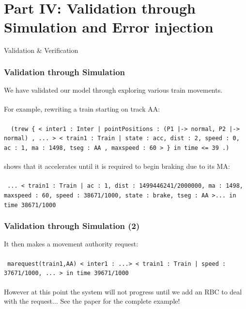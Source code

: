 \documentclass{beamer}
\begin{document}
\section{Part IV: Validation through Simulation and Error injection}

\begin{frame}
\begin{center}
{\Large Validation \& Verification}
\end{center}
\end{frame}


\begin{frame}
\frametitle{Validation through Simulation}
We have validated our model through exploring various train movements.\\ \quad \\

For example, rewriting a train starting on track AA: \\ \quad \\ 
\texttt{ \small{
(trew \{ 
  < inter1 : Inter | pointPositions : (P1 |-> normal,
                                       P2 |-> normal) , ... >
  < train1 : Train | state : acc, dist : 2, speed : 0, ac : 1, 
                     ma : 1498, tseg : AA , maxspeed : 60 > \}
in time <= 39 .)\\ \quad \\
}}
shows that it accelerates until it is required to begin braking due to its MA:\\ \quad \\

\texttt{\small{
 ... < train1 : Train | ac : 1, dist : 1499446241/2000000,
    ma : 1498, maxspeed : 60, speed : 38671/1000, 
    state : brake, tseg : AA >... in time 38671/1000
}}

\end{frame}

\begin{frame}
\frametitle{Validation through Simulation (2)}
It then makes a movement authority request: \\ \quad \\

\texttt{ \small{marequest(train1,AA) < inter1 : ...> 
 < train1 : Train | speed : 37671/1000, ... > in time 39671/1000
}}\\ \quad \\

However at this point the system will not progress until we add an RBC to deal with the request... See the paper for the complete example!

\end{frame}
\end{document}
